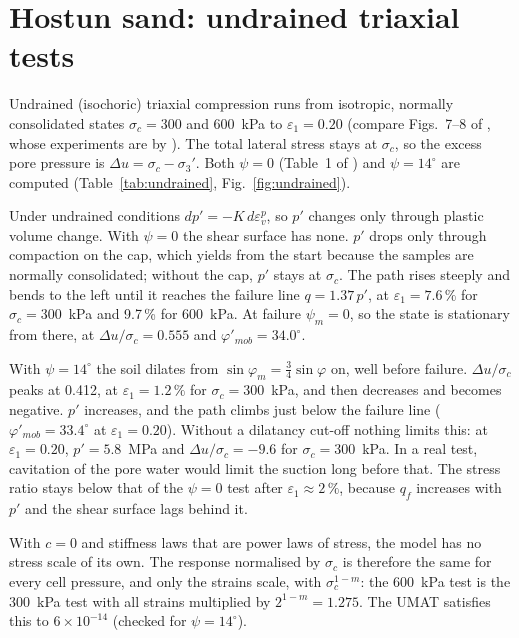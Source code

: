 \documentclass[11pt,a4paper]{article}
\begin{document}
\section{Hostun sand: undrained triaxial tests}
\label{sec:undrained}

Undrained (isochoric) triaxial compression runs from isotropic, normally consolidated states
$\sigma_c = 300$ and 600~kPa to $\varepsilon_1 = 0.20$ (compare Figs.~7--8 of \citealp{Schanz_1999}, whose
experiments are by \citet{Djedid_1986}). The total lateral stress stays at $\sigma_c$, so the excess
pore pressure is $\Delta u = \sigma_c - \sigma_3'$. Both $\psi = 0$ (Table~1 of \citealp{Schanz_1999}) and
$\psi = 14^\circ$ are computed (Table~\ref{tab:undrained}, Fig.~\ref{fig:undrained}).

Under undrained conditions $dp' = -K\,d\varepsilon_v^p$, so $p'$ changes only through plastic volume
change. With $\psi = 0$ the shear surface has none. $p'$ drops only through compaction on the cap,
which yields from the start because the samples are normally consolidated; without the cap, $p'$
stays at $\sigma_c$. The path rises steeply and bends to the left until it reaches the failure line
$q = 1.37\,p'$, at $\varepsilon_1 = 7.6\,\%$ for $\sigma_c = 300$~kPa and 9.7\,\% for 600~kPa. At
failure $\psi_m = 0$, so the state is stationary from there, at $\Delta u/\sigma_c = 0.555$ and
$\varphi'_{mob} = 34.0^\circ$.

With $\psi = 14^\circ$ the soil dilates from $\sin\varphi_m = \frac{3}{4}\sin\varphi$ on, well
before failure. $\Delta u/\sigma_c$ peaks at 0.412, at $\varepsilon_1 = 1.2\,\%$ for
$\sigma_c = 300$~kPa, and then decreases and becomes negative. $p'$ increases, and the path climbs
just below the failure line ($\varphi'_{mob} = 33.4^\circ$ at $\varepsilon_1 = 0.20$). Without a
dilatancy cut-off nothing limits this: at $\varepsilon_1 = 0.20$, $p' = 5.8$~MPa and
$\Delta u/\sigma_c = -9.6$ for $\sigma_c = 300$~kPa. In a real test, cavitation of the pore water
would limit the suction long before that. The stress ratio stays below that of the $\psi = 0$ test
after $\varepsilon_1 \approx 2\,\%$, because $q_f$ increases with $p'$ and the shear surface lags
behind it.

With $c = 0$ and stiffness laws that are power laws of stress, the model has no stress scale of its
own. The response normalised by $\sigma_c$ is therefore the same for every cell pressure, and only the
strains scale, with $\sigma_c^{1-m}$: the 600~kPa test is the 300~kPa test with all strains multiplied
by $2^{1-m} = 1.275$. The UMAT satisfies this to $6\times10^{-14}$ (checked for $\psi = 14^\circ$).
\end{document}
